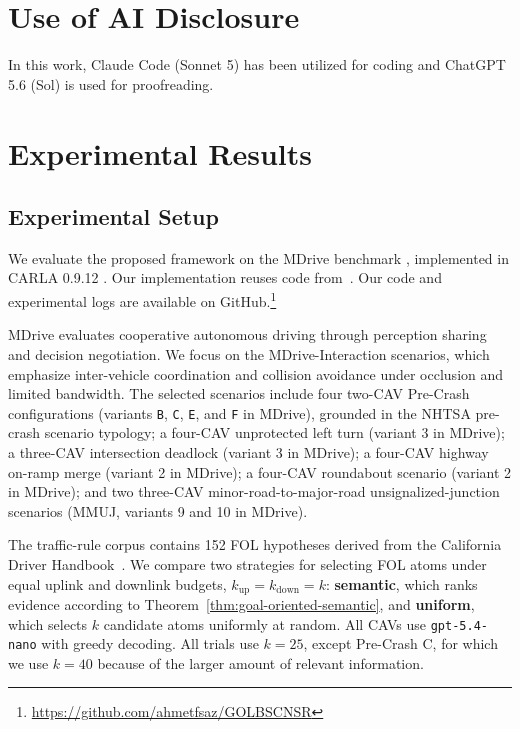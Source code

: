 \documentclass[10pt, conference, letterpaper]{ IEEEtran}
\theoremstyle{bfnote}
\begin{document}
\section{Use of AI Disclosure}

In this work, Claude Code (Sonnet 5) has been utilized for coding and ChatGPT 5.6 (Sol) is used for proofreading. 

\section{Experimental Results}
\label{sec:experimental-results}


\subsection{Experimental Setup}

We evaluate the proposed framework on the MDrive benchmark
\cite{Coscoy2026MDriveBC}, implemented in CARLA 0.9.12
\cite{Dosovitskiy2017CARLAAO}. Our implementation reuses code
from~\cite{Cui2025CoopReflectTN}. Our code and experimental logs are
available on GitHub.\footnote{\url{https://github.com/ahmetfsaz/GOLBSCNSR}}

MDrive evaluates cooperative autonomous driving through perception sharing
and decision negotiation. We focus on the MDrive-Interaction
scenarios, which emphasize inter-vehicle coordination and collision
avoidance under occlusion and limited bandwidth. The selected scenarios
include four two-CAV Pre-Crash configurations (variants \texttt{B},
\texttt{C}, \texttt{E}, and \texttt{F} in MDrive), grounded in the NHTSA pre-crash
scenario typology; a four-CAV unprotected left turn (variant 3 in MDrive); a
three-CAV intersection deadlock (variant 3 in MDrive); a four-CAV highway on-ramp
merge (variant 2 in MDrive); a four-CAV roundabout scenario (variant 2 in MDrive); and two
three-CAV minor-road-to-major-road unsignalized-junction scenarios
(MMUJ, variants 9 and 10 in MDrive).

The traffic-rule corpus contains 152 FOL hypotheses derived from the
California Driver Handbook~\cite{california_dmv_2026_handbook}. We compare
two strategies for selecting FOL atoms under equal uplink and downlink
budgets, $k_{\mathrm{up}}=k_{\mathrm{down}}=k$: \textbf{semantic}, which
ranks evidence according to Theorem~\ref{thm:goal-oriented-semantic}, and
\textbf{uniform}, which selects $k$ candidate atoms uniformly at random.
All CAVs use \texttt{gpt-5.4-nano} with greedy decoding. All trials use
$k=25$, except Pre-Crash C, for which we use $k=40$ because of the larger
amount of relevant information.
\end{document}
